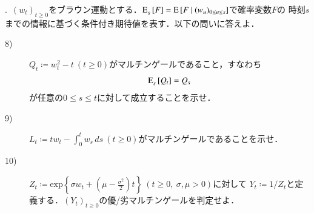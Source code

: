 .\ $(w_t)_{t \geq 0}$をブラウン運動とする．$\Exp{F}{s}{} = \cexp{F}{(w_u)_{0 \leq u \leq s}}$で確率変数$F$の
時刻$s$までの情報に基づく条件付き期待値を表す．以下の問いに答えよ．
\begin{description}
	\item[8)] $Q_t \coloneqq w_t^2 -t\ (t \geq 0)$がマルチンゲールであること，すなわち
		\begin{align}
			\Exp{Q_t}{s}{} = Q_s
		\end{align}
		が任意の$0 \leq s \leq t$に対して成立することを示せ．
	\item[9)] $L_t \coloneqq tw_t - \int_{0}^{t} w_s\, ds\ (t \geq 0)$がマルチンゲールであることを示せ．
	\item[10)] $Z_t \coloneqq \mathrm{exp}\left\{\sigma w_t + \left(\mu-\frac{\sigma^2}{2}\right)t\right\}\ (t \geq 0,\ \sigma, \mu > 0)$に対して
		$Y_t \coloneqq 1/Z_t$と定義する．$(Y_t)_{t \geq 0}$の優/劣マルチンゲールを判定せよ．
\end{description}

